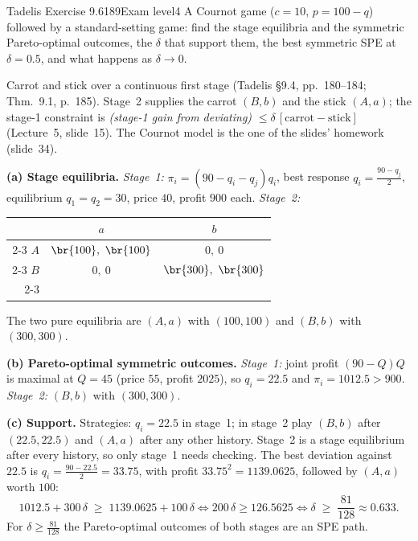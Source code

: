 \begin{exsol}{Tadelis Exercise 9.6}{189}{Exam level}{4}
\asked A Cournot game ($c = 10$, $p = 100 - q$) followed by a standard-setting game: find the stage
equilibria and the symmetric Pareto-optimal outcomes, the $\delta$ that support them, the best symmetric SPE
at $\delta = 0.5$, and what happens as $\delta \to 0$.

\method Carrot and stick over a continuous first stage (Tadelis \S9.4, pp.~180--184; Thm.~9.1, p.~185).
Stage~2 supplies the carrot $(B,b)$ and the stick $(A,a)$; the stage-1 constraint is
\emph{(stage-1 gain from deviating)} $\le \delta\,[\text{carrot} - \text{stick}]$ (Lecture~5, slide~15). The
Cournot model is the one of the slides' homework (slide~34).

\solution
\textbf{(a) Stage equilibria.} \emph{Stage~1:} $\pi_i = (90 - q_i - q_j)q_i$, best response $q_i = \frac{90 - q_j}{2}$,
equilibrium $q_1 = q_2 = 30$, price $40$, profit $900$ each. \emph{Stage~2:}
\begin{center}
\begin{tabular}{r|c|c|}
\multicolumn{1}{r}{} & \multicolumn{1}{c}{$a$} & \multicolumn{1}{c}{$b$}\\ \cline{2-3}
$A$ & $\br{100},\ \br{100}$ & $0,\ 0$ \\ \cline{2-3}
$B$ & $0,\ 0$ & $\br{300},\ \br{300}$ \\ \cline{2-3}
\end{tabular}
\end{center}
The two pure equilibria are $(A,a)$ with $(100,100)$ and $(B,b)$ with $(300,300)$.

\textbf{(b) Pareto-optimal symmetric outcomes.} \emph{Stage~1:} joint profit $(90 - Q)Q$ is maximal at $Q = 45$
(price $55$, profit $2025$), so $q_i = 22.5$ and $\pi_i = 1012.5 > 900$. \emph{Stage~2:} $(B,b)$ with $(300,300)$.

\textbf{(c) Support.} Strategies: $q_i = 22.5$ in stage~1; in stage~2 play $(B,b)$ after $(22.5,22.5)$ and $(A,a)$ after
any other history. Stage~2 is a stage equilibrium after every history, so only stage~1 needs checking. The best
deviation against $22.5$ is $q_i = \frac{90 - 22.5}{2} = 33.75$, with profit $33.75^2 = 1139.0625$, followed by $(A,a)$
worth $100$:
\[
  1012.5 + 300\,\delta \;\ge\; 1139.0625 + 100\,\delta
  \iff 200\,\delta \ge 126.5625 \iff \delta \;\ge\; \frac{81}{128} \approx 0.633 .
\]
For $\delta \ge \frac{81}{128}$ the Pareto-optimal outcomes of both stages are an SPE path.


\end{exsol}

